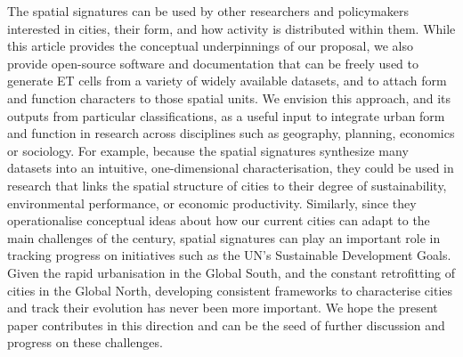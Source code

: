 The spatial signatures can be used by other researchers and policymakers
interested in cities, their form, and how activity is distributed within
them.
%
While this article provides the conceptual underpinnings of our proposal, we
also provide open-source software and documentation that can be freely used to
generate ET cells from a variety of widely available datasets, and to attach
form and function characters to those spatial units.
%
We envision this approach, and its outputs from particular
classifications, as a useful input to integrate urban form and function in
research across disciplines such as geography, planning, economics or
sociology.
%
For example, because the spatial signatures synthesize many datasets into an
intuitive, one-dimensional characterisation, they could be used in research
that links the spatial structure of cities to their degree of sustainability,
environmental performance, or economic productivity.
Similarly, since they operationalise conceptual ideas about how our current
cities can adapt to the main challenges of the century, spatial signatures
can play an important role in tracking progress on initiatives such as the
UN's Sustainable Development Goals.
%
Given the rapid urbanisation in the Global South, and the constant
retrofitting of cities in the Global North, developing consistent frameworks
to characterise cities and track their evolution has never been more
important.
%
We hope the present paper contributes in this direction and can be the seed
of further discussion and progress on these challenges.



